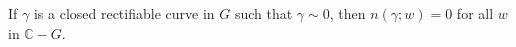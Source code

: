 If $\gamma$ is a closed rectifiable curve in $G$ such that $\gamma \sim 0$, then $n(\gamma; w) = 0$ for all $w$ in $\mathbb{C} - G$.
